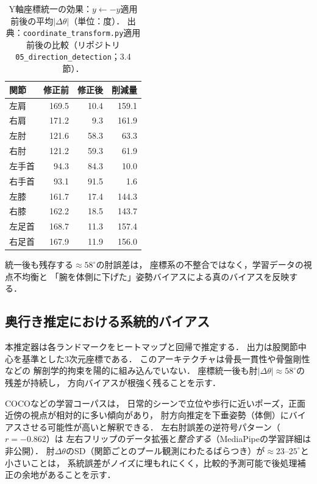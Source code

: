 \documentclass[fleqn]{ieej}
\begin{document}
\begin{table}[!t]
\centering
\caption{Y軸座標統一の効果：$y \leftarrow -y$適用前後の平均$|\Delta\theta|$（単位：度）．
  出典：\texttt{coordinate\_transform.py}適用前後の比較（リポジトリ\texttt{05\_direction\_detection}；3.4節）．}
\label{tab:yflip_effect}
\small
\begin{tabular}{lrrr}
\toprule
関節     & 修正前 & 修正後 & 削減量 \\
\midrule
左肩  & 169.5 & 10.4 & 159.1 \\
右肩  & 171.2 &  9.3 & 161.9 \\
左肘  & 121.6 & 58.3 &  63.3 \\
右肘  & 121.2 & 59.3 &  61.9 \\
左手首 &  94.3 & 84.3 &  10.0 \\
右手首 &  93.1 & 91.5 &   1.6 \\
左膝  & 161.7 & 17.4 & 144.3 \\
右膝  & 162.2 & 18.5 & 143.7 \\
左足首 & 168.7 & 11.3 & 157.4 \\
右足首 & 167.9 & 11.9 & 156.0 \\
\bottomrule
\end{tabular}
\end{table}

統一後も残存する$\approx58^{\circ}$の肘誤差は，
座標系の不整合ではなく，学習データの視点不均衡と
「腕を体側に下げた」姿勢バイアスによる真のバイアスを反映する．

\subsection{奥行き推定における系統的バイアス}

本推定器は各ランドマークをヒートマップと回帰で推定する\cite{blazepose}．
出力は股関節中心を基準とした3次元座標である．
このアーキテクチャは骨長一貫性や骨盤剛性などの
解剖学的拘束を陽的に組み込んでいない．
座標統一後も肘$|\Delta\theta|\approx58^{\circ}$の残差が持続し，
方向バイアスが根強く残ることを示す．

COCO\cite{coco}などの学習コーパスは，
日常的シーンで立位や歩行に近いポーズ，正面近傍の視点が相対的に多い傾向があり，
肘方向推定を下垂姿勢（体側）にバイアスさせる可能性が高いと解釈できる．
左右肘誤差の逆符号パターン（$r=-0.862$）は
左右フリップのデータ拡張と\emph{整合する}（MediaPipeの学習詳細は非公開）．
肘$\Delta\theta$のSD（関節ごとのプール観測にわたるばらつき）が$\approx23$--$25^{\circ}$と小さいことは，
系統誤差がノイズに埋もれにくく，比較的予測可能で後処理補正の余地があることを示す．
\end{document}
